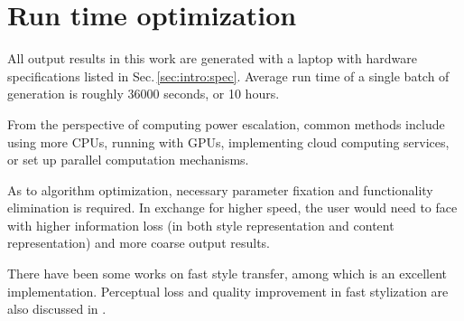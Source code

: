 
\section{Run time optimization}

All output results in this work are generated with a laptop with hardware specifications listed in Sec.\,\ref{sec:intro:spec}.
Average run time of a single batch of generation is roughly 36000 seconds, or 10 hours.

From the perspective of computing power escalation, common methods include using more CPUs,
running with GPUs, implementing cloud computing services, or set up parallel computation mechanisms.

As to algorithm optimization, necessary parameter fixation and functionality elimination is required.
In exchange for higher speed, the user would need to face with higher information loss
(in both style representation and content representation)
and more coarse output results.

There have been some works on fast style transfer, among which \cite{engstrom2016faststyletransfer} is an excellent implementation.
Perceptual loss and quality improvement in fast stylization are also discussed in \cite{Johnson:2016hp, Ulyanov:2016wk}.
